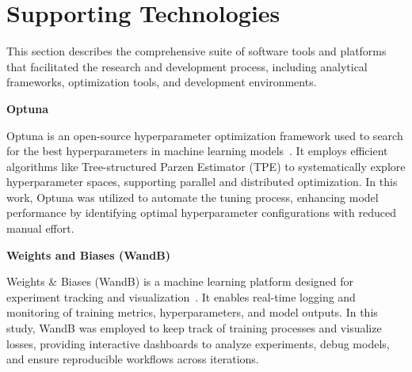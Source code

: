 





\section{Supporting Technologies}

This section describes the comprehensive suite of software tools and platforms that facilitated the research and development process, including analytical frameworks, optimization tools, and development environments.


\textbf{Optuna}

Optuna is an open-source hyperparameter optimization framework used to search for the best hyperparameters in machine learning models~\cite{akiba_optuna_2019}. It employs efficient algorithms like Tree-structured Parzen Estimator (TPE) to systematically explore hyperparameter spaces, supporting parallel and distributed optimization. In this work, Optuna was utilized to automate the tuning process, enhancing model performance by identifying optimal hyperparameter configurations with reduced manual effort.

\textbf{Weights and Biases (WandB)}

Weights \& Biases (WandB) is a machine learning platform designed for experiment tracking and visualization~\cite{noauthor_weights_nodate}. It enables real-time logging and monitoring of training metrics, hyperparameters, and model outputs. In this study, WandB was employed to keep track of training processes and visualize losses, providing interactive dashboards to analyze experiments, debug models, and ensure reproducible workflows across iterations.

